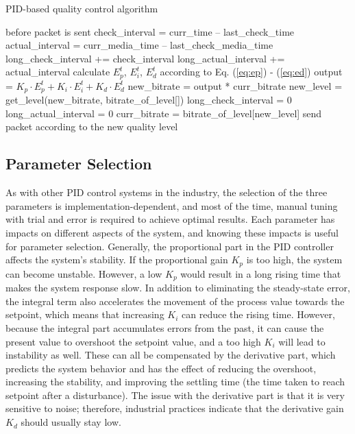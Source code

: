 \documentclass[journal,draftclsnofoot,onecolumn]{IEEEtran}
\begin{document}
\begin{algorithm}
\caption{PID-based quality control algorithm}
\label{algo:control}
\begin{algorithmic}
    \STATE before packet is sent
    \STATE check\_interval = curr\_time -- last\_check\_time
    \STATE actual\_interval = curr\_media\_time -- last\_check\_media\_time
    \STATE long\_check\_interval += check\_interval
    \STATE long\_actual\_interval += actual\_interval
    \STATE calculate $E_p^t$, $E_i^t$, $E_d^t$ according to Eq. (\ref{eq:ep}) - (\ref{eq:ed})
    \STATE output = ${K_p} \cdot E_p^t + {K_i} \cdot E_i^t + {K_d} \cdot E_d^t$
    \STATE new\_bitrate = output * curr\_bitrate
    \STATE new\_level = get\_level(new\_bitrate, bitrate\_of\_level[])
    	\STATE long\_check\_interval = 0
    	\STATE long\_actual\_interval = 0
    	\STATE curr\_bitrate = bitrate\_of\_level[new\_level]
    \ENDIF
    \STATE send packet according to the new quality level
\end{algorithmic}
\end{algorithm}


\subsection{Parameter Selection}
\label{subsec:parameter-selection}

As with other PID control systems in the industry, the selection of the three parameters is implementation-dependent, and most of the time, manual tuning with trial and error is required to achieve optimal results. Each parameter has impacts on different aspects of the system, and knowing these impacts is useful for parameter selection. Generally, the proportional part in the PID controller affects the system's stability. If the proportional gain $K_p$ is too high, the system can become unstable. However, a low $K_p$ would result in a long rising time that makes the system response slow. In addition to eliminating the steady-state error, the integral term also accelerates the movement of the process value towards the setpoint, which means that increasing $K_i$ can reduce the rising time. However, because the integral part accumulates errors from the past, it can cause the present value to overshoot the setpoint value, and a too high $K_i$ will lead to instability as well. These can all be compensated by the derivative part, which predicts the system behavior and has the effect of reducing the overshoot, increasing the stability, and improving the settling time (the time taken to reach setpoint after a disturbance). The issue with the derivative part is that it is very sensitive to noise; therefore, industrial practices indicate that the derivative gain $K_d$ should usually stay low.
\end{document}

